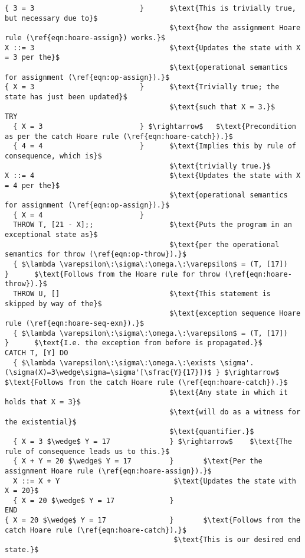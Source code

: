 \begin{lstlisting}[mathescape=true,keepspaces=true,label=lst:hoare_ex_asgn,caption=A small program demonstrating a try-catch statement.]
{ 3 = 3                         }      $\text{This is trivially true, but necessary due to}$
                                       $\text{how the assignment Hoare rule (\ref{eqn:hoare-assign}) works.}$
X ::= 3                                $\text{Updates the state with X = 3 per the}$
                                       $\text{operational semantics for assignment (\ref{eqn:op-assign}).}$
{ X = 3                         }      $\text{Trivially true; the state has just been updated}$
                                       $\text{such that X = 3.}$
TRY
  { X = 3                       } $\rightarrow$   $\text{Precondition as per the catch Hoare rule (\ref{eqn:hoare-catch}).}$
  { 4 = 4                       }      $\text{Implies this by rule of consequence, which is}$
                                       $\text{trivially true.}$
X ::= 4                                $\text{Updates the state with X = 4 per the}$
                                       $\text{operational semantics for assignment (\ref{eqn:op-assign}).}$
  { X = 4                       }
  THROW T, [21 - X];;                  $\text{Puts the program in an exceptional state as}$
                                       $\text{per the operational semantics for throw (\ref{eqn:op-throw}).}$
  { $\lambda \varepsilon\:\sigma\:\omega.\:\varepsilon$ = (T, [17])          }      $\text{Follows from the Hoare rule for throw (\ref{eqn:hoare-throw}).}$
  THROW U, []                          $\text{This statement is skipped by way of the}$
                                       $\text{exception sequence Hoare rule (\ref{eqn:hoare-seq-exn}).}$
  { $\lambda \varepsilon\:\sigma\:\omega.\:\varepsilon$ = (T, [17])          }      $\text{I.e. the exception from before is propagated.}$
CATCH T, [Y] DO
  { $\lambda \varepsilon\:\sigma\:\omega.\:\exists \sigma'.(\sigma(X)=3\wedge\sigma=\sigma'[\sfrac{Y}{17}])$ } $\rightarrow$    $\text{Follows from the catch Hoare rule (\ref{eqn:hoare-catch}).}$
                                       $\text{Any state in which it holds that X = 3}$
                                       $\text{will do as a witness for the existential}$
                                       $\text{quantifier.}$
  { X = 3 $\wedge$ Y = 17              } $\rightarrow$    $\text{The rule of consequence leads us to this.}$
  { X + Y = 20 $\wedge$ Y = 17         }       $\text{Per the assignment Hoare rule (\ref{eqn:hoare-assign}).}$
  X ::= X + Y                           $\text{Updates the state with X = 20}$
  { X = 20 $\wedge$ Y = 17             }
END
{ X = 20 $\wedge$ Y = 17               }       $\text{Follows from the catch Hoare rule (\ref{eqn:hoare-catch}).}$
                                        $\text{This is our desired end state.}$
\end{lstlisting}